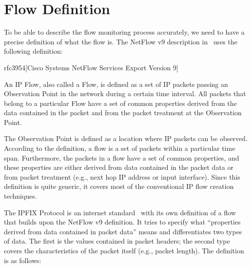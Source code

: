 \section{Flow Definition}\label{sec:flow-definition}

To be able to describe the flow monitoring process accurately, we need to have a precise definition of what the flow is. The NetFlow v9 description in~\cite{rfc3954} uses the following definition:

\begin{displaycquote}{rfc3954}[Cisco Systems NetFlow Services Export Version 9]

    An IP Flow, also called a Flow, is defined as a set of IP packets
    passing an Observation Point in the network during a certain time
    interval. All packets that belong to a particular Flow have a set of
    common properties derived from the data contained in the packet and
    from the packet treatment at the Observation Point.

\end{displaycquote}

The Observation Point is defined as a location where IP packets can be observed. According to the definition, a flow is a set of packets within a particular time span. Furthermore, the packets in a flow have a set of common properties, and these properties are either derived from data contained in the packet data or from packet treatment (e.g., next hop IP address or input interface). Since this definition is quite generic, it covers most of the conventional IP flow creation techniques.

The IPFIX Protocol is an internet standard~\cite{rfc7011} with its own definition of a flow that builds upon the NetFlow v9 definition. It tries to specify what “properties derived from data contained in packet data” means and differentiates two types of data. The first is the values contained in packet headers; the second type covers the characteristics of the packet itself (e.g., packet length). The definition is as follows:

